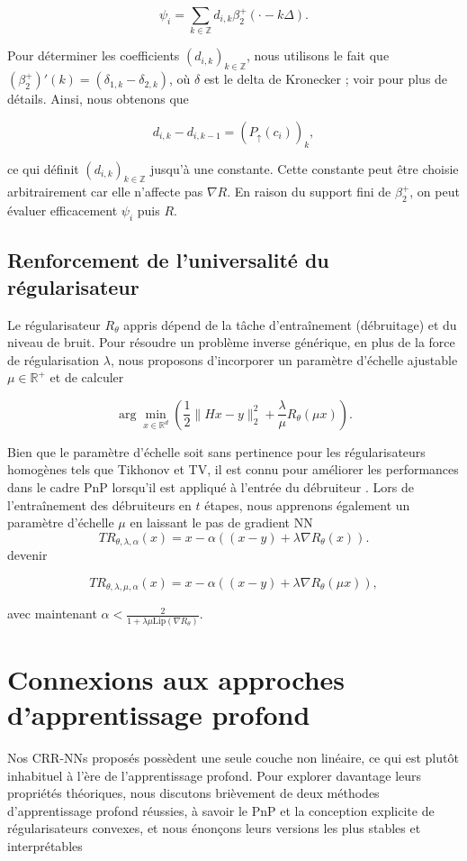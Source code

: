 \documentclass[a4paper, 12pt]{report} %
\begin{document}
\[
\psi_i = \sum_{k \in \mathbb{Z}} d_{i,k} \beta_2^+ \left( \cdot - k \Delta \right). 
\]

Pour déterminer les coefficients \( (d_{i,k})_{k \in \mathbb{Z}} \), nous utilisons le fait que \( (\beta_2^+)'(k) = (\delta_{1,k} - \delta_{2,k}) \), où \( \delta \) est le delta de Kronecker ; voir \cite{unser1999splines} pour plus de détails. Ainsi, nous obtenons que 

\[
d_{i,k} - d_{i,k-1} = (P_{\uparrow}(c_i))_k,
\]

ce qui définit \( (d_{i,k})_{k \in \mathbb{Z}} \) jusqu'à une constante. Cette constante peut être choisie arbitrairement car elle n'affecte pas \( \nabla R \). En raison du support fini de \( \beta_2^+ \), on peut évaluer efficacement \( \psi_i \) puis \( R \).
\subsection{Renforcement de l'universalité du régularisateur}
Le régularisateur \( R_\theta \) appris dépend de la tâche d'entraînement (débruitage) et du niveau de bruit. Pour résoudre un problème inverse générique, en plus de la force de régularisation \( \lambda \), nous proposons d'incorporer un paramètre d'échelle ajustable \( \mu \in \mathbb{R}^+ \) et de calculer

\[
\arg \min_{x \in \mathbb{R}^d} \left( \frac{1}{2} \|Hx - y\|_2^2 + \frac{\lambda}{\mu} R_\theta(\mu x) \right).
\]

Bien que le paramètre d'échelle soit sans pertinence pour les régularisateurs homogènes tels que Tikhonov et TV, il est connu pour améliorer les performances dans le cadre PnP lorsqu'il est appliqué à l'entrée du débruiteur \cite{xu2020boosting}. Lors de l'entraînement des débruiteurs en \( t \) étapes, nous apprenons également un paramètre d'échelle \( \mu \) en laissant le pas de gradient \( \text{NN} \) \[
TR_{\theta, \lambda, \alpha}(x) = x - \alpha \left( (x - y) + \lambda \nabla R_\theta(x) \right).
\]
 devenir

\[
TR_{\theta, \lambda, \mu, \alpha}(x) = x - \alpha \left( (x - y) + \lambda \nabla R_\theta(\mu x) \right), 
\]

avec maintenant \( \alpha < \frac{2}{1 + \lambda \mu \text{Lip}(\nabla R_\theta)} \).
\section{Connexions aux approches d'apprentissage profond}
Nos CRR-NNs proposés possèdent une seule couche non linéaire, ce qui est plutôt inhabituel à l'ère de l'apprentissage profond. Pour explorer davantage leurs propriétés théoriques, nous discutons brièvement de deux méthodes d'apprentissage profond réussies, à savoir le PnP et la conception explicite de régularisateurs convexes, et nous énonçons leurs versions les plus stables et interprétables





\end{document}
